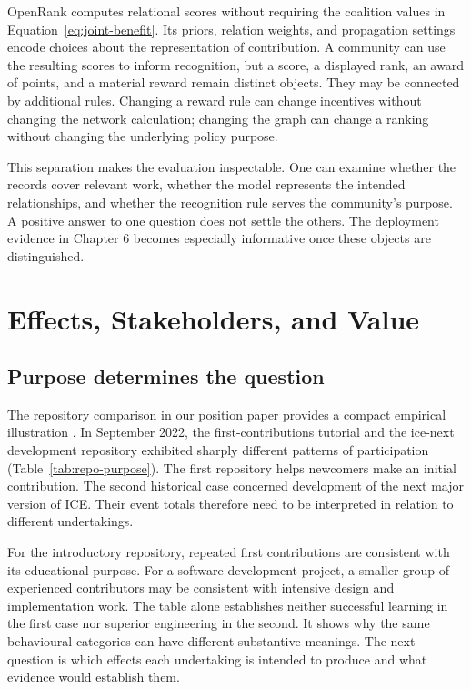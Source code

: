 OpenRank computes relational scores without requiring the coalition values in Equation~\ref{eq:joint-benefit}. Its priors, relation weights, and propagation settings encode choices about the representation of contribution. A community can use the resulting scores to inform recognition, but a score, a displayed rank, an award of points, and a material reward remain distinct objects. They may be connected by additional rules. Changing a reward rule can change incentives without changing the network calculation; changing the graph can change a ranking without changing the underlying policy purpose.

This separation makes the evaluation inspectable. One can examine whether the records cover relevant work, whether the model represents the intended relationships, and whether the recognition rule serves the community's purpose. A positive answer to one question does not settle the others. The deployment evidence in Chapter 6 becomes especially informative once these objects are distinguished.

\section{Effects, Stakeholders, and Value}
\label{sec:stakeholders}
\label{sec:purpose}

\subsection{Purpose determines the question}
The repository comparison in our position paper provides a compact empirical illustration \citep[Table 4]{han2024ose}. In September 2022, the first-contributions tutorial and the ice-next development repository exhibited sharply different patterns of participation (Table~\ref{tab:repo-purpose}). The first repository helps newcomers make an initial contribution. The second historical case concerned development of the next major version of ICE. Their event totals therefore need to be interpreted in relation to different undertakings.



For the introductory repository, repeated first contributions are consistent with its educational purpose. For a software-development project, a smaller group of experienced contributors may be consistent with intensive design and implementation work. The table alone establishes neither successful learning in the first case nor superior engineering in the second. It shows why the same behavioural categories can have different substantive meanings. The next question is which effects each undertaking is intended to produce and what evidence would establish them.

